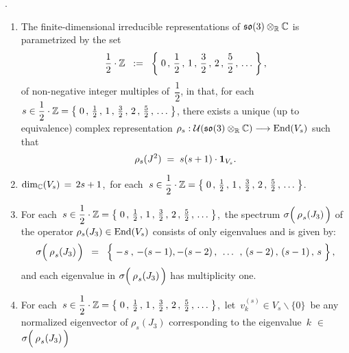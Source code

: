 \begin{theorem}
{\color{white}.}\vskip -0.1cm
\noindent
\begin{enumerate}
\item
	The finite-dimensional irreducible representations of $\mathfrak{so}(3) \otimes_{\mathbb{R}} \mathbb{C}$ is parametrized by the set
	\begin{equation*}
	\dfrac{1}{2} \cdot \mathbb{Z}
	\;\; := \;\;
		\left\{\;0 \,,\, \dfrac{1}{2} \,,\, 1 \,,\, \frac{3}{2} \,,\, 2 \,,\, \frac{5}{2} \,,\, \ldots \;\right\},
	\end{equation*}
	of non-negative integer multiples of \,$\dfrac{1}{2}$, in that, for each
	$s \in \dfrac{1}{2} \cdot \mathbb{Z} = \left\{\; 0 \,,\, \frac{1}{2}\,,\, 1\,,\, \frac{3}{2}\,,\, 2\,,\, \frac{5}{2}\,,\, \ldots \;\right\}$,
	there exists a unique (up to equivalence) complex representation
	$\rho_{s} : \mathcal{U}(\mathfrak{so}(3)\otimes_{\mathbb{R}}\mathbb{C}) \longrightarrow \textnormal{End}(V_{s})$
	such that
	\begin{equation*}
	\rho_{s}(J^{2}) \; = \; s(s+1)\cdot\textnormal{\textbf{1}}_{V_{s}}.
	\end{equation*}
\item
	$\dim_{\mathbb{C}}(V_{s}) \, = \, 2s + 1$,\, for each
	\,$s \in \dfrac{1}{2} \cdot \mathbb{Z} = \left\{\; 0 \,,\, \frac{1}{2}\,,\, 1\,,\, \frac{3}{2}\,,\, 2\,,\, \frac{5}{2}\,,\, \ldots \;\right\}$.
\item
	For each
	\,$s \in \dfrac{1}{2} \cdot \mathbb{Z} = \left\{\; 0 \,,\, \frac{1}{2}\,,\, 1\,,\, \frac{3}{2}\,,\, 2\,,\, \frac{5}{2}\,,\, \ldots \;\right\}$,\,
	the spectrum
	$\sigma\!\left(\,\overset{{\color{white}-}}{\rho}_{s}(J_{3})\,\right)$
	of the operator $\rho_{s}(J_{3}) \in \textnormal{End}(V_{s})$
	consists of only eigenvalues and is given by:
	\begin{equation*}
	\sigma\!\left(\,\overset{{\color{white}-}}{\rho}_{s}(J_{3})\,\right)
	\;\; = \;\;
		\left\{\;
			-\overset{{\color{white}-}}{s} \,,\, -(s-1), -(s-2)
			\,,\;\, \ldots \,\;,\,
			(s-2) \,,\, (s-1) \,,\, s
			\;\right\},
	\end{equation*}
	and each eigenvalue in 
	$\sigma\!\left(\,\overset{{\color{white}-}}{\rho}_{s}(J_{3})\,\right)$
	has multiplicity one.
\item
	For each
	\,$s \in \dfrac{1}{2} \cdot \mathbb{Z} = \left\{\; 0 \,,\, \frac{1}{2}\,,\, 1\,,\, \frac{3}{2}\,,\, 2\,,\, \frac{5}{2}\,,\, \ldots \;\right\}$,\,
	let \,$v^{(s)}_{k} \in V_{s}\backslash\{0\}$\, be any normalized eigenvector
	of $\rho_{s}(J_{3})$ corresponding to the eigenvalue
	\,$k$ $\in$ $\sigma\!\left(\,\overset{{\color{white}-}}{\rho}_{s}(J_{3})\,\right)$

\end{enumerate}
\end{theorem}
